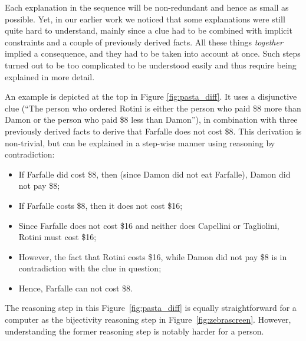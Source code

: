 
Each explanation in the sequence will be non-redundant and hence as small as possible. Yet, in our earlier work we noticed that some explanations were still quite hard to understand, mainly since a clue had to be combined with implicit constraints and a couple of previously derived facts. All these things \textit{together} implied a consequence, and they had to be taken into account at once.
Such steps turned out to be too complicated to be understood easily and thus require being explained in more detail.

An example is depicted at the top in Figure \ref{fig:pasta_diff}.
It uses a disjunctive clue (``The person who ordered Rotini is either the person who paid \$8 more than Damon or the person who paid \$8 less than Damon''), in combination with three previously derived facts to derive that Farfalle does not cost \$8.
This derivation is non-trivial, but can be explained in a step-wise manner using reasoning by contradiction:
\begin{itemize}
    \item If Farfalle did cost \$8, then (since Damon did not eat Farfalle), Damon did not pay \$8;
    \item If Farfalle costs \$8, then it does not cost \$16;
    \item Since Farfalle does not cost \$16 and neither does Capellini or Tagliolini, Rotini must cost \$16;
    \item However, the fact that Rotini costs \$16, while Damon did not pay \$8 is in contradiction with the clue in question;
    \item Hence, Farfalle can not cost \$8.
\end{itemize}
The reasoning step in this Figure~\ref{fig:pasta_diff} is equally straightforward for a computer as the bijectivity reasoning step in Figure~\ref{fig:zebrascreen}. However, understanding the former reasoning step is notably harder for a person.

